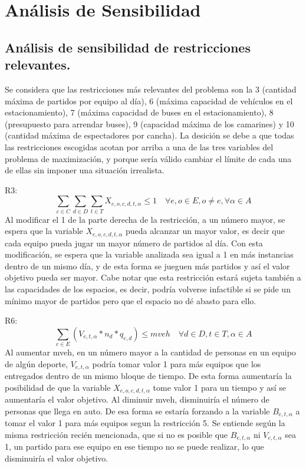\section{Análisis de Sensibilidad}

\subsection{Análisis de sensibilidad de restricciones relevantes. }

\indent Se considera que las restricciones más relevantes del problema son la 3 (cantidad máxima de partidos por equipo al día), 6 (máxima capacidad de vehículos en el estacionamiento), 7 (máxima capacidad de buses en el estacionamiento), 8 (presupuesto para arrendar buses), 9 (capacidad máxima de los camarines) y 10 (cantidad máxima de espectadores por cancha). La desición se debe a que todas las restricciones escogidas acotan por arriba a una de las tres variables del problema de maximización, y porque sería válido cambiar el límite de cada una de ellas sin imponer una situación irrealista. 

R3: \[\sum_{c\in C}\sum_{d\in D}\sum_{t\in T}{X_{e,o,c,d,t,\alpha}}\leq 1 \quad \forall e,o\in E,o\neq e,\forall \alpha\in A\]
Al modificar el 1 de la parte derecha de la restricción, a un número mayor, se espera que la variable $X_{e,o,c,d,t,\alpha}$ pueda alcanzar un mayor valor, es decir que cada equipo pueda jugar un mayor número de partidos al día. Con esta modificación, se espera que la variable analizada sea igual a 1 en más instancias dentro de un mismo día, y de esta forma se jueguen más partidos y así el valor objetivo pueda ser mayor. Cabe notar que esta restricción estará sujeta también a las capacidades de los espacios, es decir, podría volverse infactible si se pide un mínimo mayor de partidos pero que el espacio no dé abasto para ello.

R6:\[\sum_{e\in E}{(V_{e,t,\alpha}*n_{d}*q_{e,d})}\leq mveh \quad \forall d\in D, t\in T, \alpha\in A\]  
Al aumentar mveh, en un número mayor a la cantidad de personas en un equipo de algún deporte, $V_{e,t,\alpha}$ podría tomar valor 1 para más equipos que los entregados dentro de un mismo bloque de tiempo. De esta forma aumentaría la posibilidad de que la variable $X_{e,o,c,d,t,\alpha}$ tome valor 1 para un tiempo y así se aumentaría el valor objetivo. Al diminuir mveh, disminuiría el número de personas que llega en auto. De esa forma se estaría forzando a la variable $B_{e,t,\alpha}$ a tomar el valor 1 para más equipos segun la restricción 5. Se entiende según la misma restricción recién mencionada, que si no es posible que $B_{e,t,\alpha}$ ni $V_{e,t,\alpha}$ sea 1, un partido para ese equipo en ese tiempo no se puede realizar, lo que disminuiría el valor objetivo.

